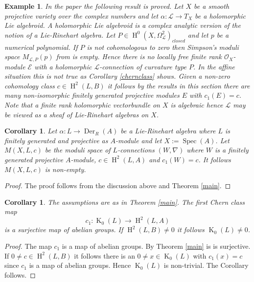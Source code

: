 \documentclass{amsart}
\theoremstyle{plain}
\newtheorem{corollary}[theorem]{Corollary}
\newtheorem{example}[theorem]{Example}
\theoremstyle{definition}
\theoremstyle{remark}
\numberwithin{equation}{theorem}
\begin{document}
\begin{example} 

In the paper \cite{tortella} the following result is proved. Let $X$ be a smooth projective variety over the complex numbers
and let $\alpha:\mathcal{L}\rightarrow T_X$ be a holomorphic Lie algebroid. A holomorphic Lie algebroid is a complex analytic 
version of the notion of a Lie-Rinehart algebra. Let $P\in {\operatorname{H} }^0(X, \Omega^2_{\mathcal{L}})_{closed}$ 
and let $p$ be a numerical polynomial. If $P$ is not cohomologous to zero then Simpson's moduli space $M_{\mathcal{L},P}(p)$ 
from \cite{simpson} is empty.
Hence there is no locally free finite rank  ${\mathcal{O} }_X$-module $\mathcal{E}$ with a holomorphic $\mathcal{L}$-connection of 
curvature type $P$. In the affine situation
this is not true as Corollary \ref{chernclass} shows. Given a non-zero cohomology class $c\in {\operatorname{H} }^2(L,B)$ it follows
by the results in this section there are many non-isomorphic finitely generated projective modules $E$ with $c_1(E)=c$.
Note that a finite rank holomorphic vectorbundle on $X$ is algebraic hence $\mathcal{L}$ may be viewed as 
a \emph{sheaf of Lie-Rinehart algebras} on $X$.
\end{example}

\begin{corollary} Let $\alpha:L\rightarrow {\operatorname{Der} }_{R}({A})$ be a Lie-Rinehart algebra where $L$ is finitely generated and
projective as ${A}$-module and let $X:={\operatorname{Spec} }({A})$. Let $M(X,L,c)$ be the moduli space of $L$-connections 
$(W,\nabla)$ where $W$ is a finitely generated
projective ${A}$-module, $c\in {\operatorname{H} }^2(L,{A})$ and $c_1(W)=c$. It follows $M(X,L,c)$ is non-empty.
\end{corollary}
\begin{proof} The proof follows from the discussion above and Theorem \ref{main}.
\end{proof}

\begin{corollary} \label{chernsurjective} The assumptions are as in Theorem \ref{main}. The first Chern class map
\[ c_1:{\operatorname{K}}_0(L) \rightarrow {\operatorname{H} }^2(L,{A}) \]
is a surjective map of abelian groups.
If ${\operatorname{H} }^2(L,B)\neq 0$ it follows ${\operatorname{K}}_0(L) \neq 0$.
\end{corollary}
\begin{proof} The map $c_1$ is a map of abelian groups. By Theorem \ref{main} is is surjective. 
If $0\neq c\in {\operatorname{H} }^2(L,B)$ it follows there is an $0\neq x\in {\operatorname{K}}_0(L)$ with $c_1(x)=c$ since $c_1$ is a map of
abelian groups. Hence ${\operatorname{K}}_0(L)$ is non-trivial. The Corollary follows. 
\end{proof}
\end{document}
